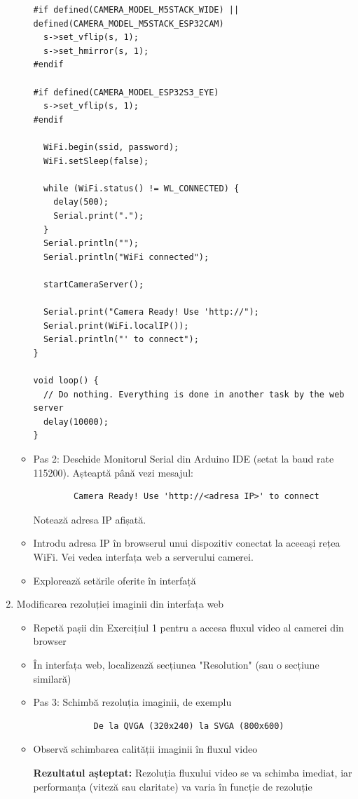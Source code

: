 \documentclass{report}
\begin{document}
\begin{enumerate}
\begin{itemize}
\begin{lstlisting}
#if defined(CAMERA_MODEL_M5STACK_WIDE) || defined(CAMERA_MODEL_M5STACK_ESP32CAM)
  s->set_vflip(s, 1);
  s->set_hmirror(s, 1);
#endif

#if defined(CAMERA_MODEL_ESP32S3_EYE)
  s->set_vflip(s, 1);
#endif

  WiFi.begin(ssid, password);
  WiFi.setSleep(false);

  while (WiFi.status() != WL_CONNECTED) {
    delay(500);
    Serial.print(".");
  }
  Serial.println("");
  Serial.println("WiFi connected");

  startCameraServer();

  Serial.print("Camera Ready! Use 'http://");
  Serial.print(WiFi.localIP());
  Serial.println("' to connect");
}

void loop() {
  // Do nothing. Everything is done in another task by the web server
  delay(10000);
}
\end{lstlisting}

    \item Pas 2: Deschide Monitorul Serial din Arduino IDE (setat la baud rate 115200). Așteaptă până vezi mesajul:
    \begin{verbatim}
        Camera Ready! Use 'http://<adresa IP>' to connect

    \end{verbatim}
    Notează adresa IP afișată.
    \item Introdu adresa IP în browserul unui dispozitiv conectat la aceeași rețea WiFi. Vei vedea interfața web a serverului camerei.
    \item  Explorează setările oferite în interfață 
\end{itemize}

    \item Modificarea rezoluției imaginii din interfața web
    \begin{itemize}
        \item  Repetă pașii din Exercițiul 1 pentru a accesa fluxul video al camerei din browser
        \item În interfața web, localizează secțiunea "Resolution" (sau o secțiune similară)
        \item Pas 3: Schimbă rezoluția imaginii, de exemplu
        \begin{verbatim}
            De la QVGA (320x240) la SVGA (800x600)
        \end{verbatim}
        \item Observă schimbarea calității imaginii în fluxul video
        
        \textbf{Rezultatul așteptat: }Rezoluția fluxului video se va schimba imediat, iar performanța (viteză sau claritate) va varia în funcție de rezoluție
    \end{itemize}
\end{enumerate}
\vspace*{1cm}
\end{document}
